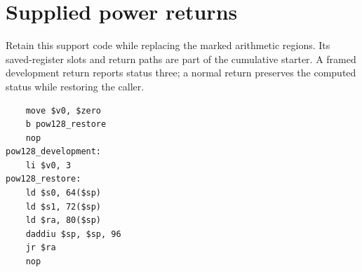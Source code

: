 \section{Supplied power returns}
Retain this support code while replacing the marked arithmetic regions. Its saved-register slots and return paths are part of the cumulative starter. A framed development return reports status three; a normal return preserves the computed status while restoring the caller.

\begin{verbatim}
    move $v0, $zero
    b pow128_restore
    nop
pow128_development:
    li $v0, 3
pow128_restore:
    ld $s0, 64($sp)
    ld $s1, 72($sp)
    ld $ra, 80($sp)
    daddiu $sp, $sp, 96
    jr $ra
    nop
\end{verbatim}
